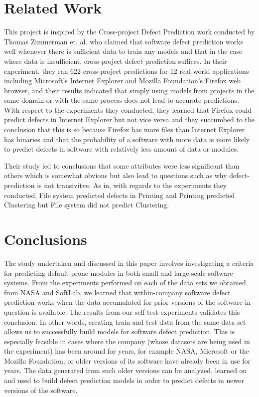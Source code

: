 \documentclass{sig-alternate}
\begin{document}
\section{Related Work}
This project is inspired by the Cross-project Defect Prediction work conducted by Thomas Zimmerman et. al. who claimed that software defect prediction works well whenever there is sufficient data to train any models and that in the case where data is insufficient, cross-project defect prediction suffices\cite{zimmerman09}. In their experiment, they ran 622 cross-project predictions for 12 real-world applications including Microsoft's Internet Explorer and Mozilla Foundation's Firefox web browser, and their results indicated that simply using models from projects in the same domain or with the same process does not lead to accurate predictions. With respect to the experiments they conducted, they learned that Firefox could predict defects in Internet Explorer but not vice versa and they succumbed to the conclusion that this is so because Firefox has more files than Internet Explorer has binaries and that the probability of a software with more data is more likely to predict defects in software with relatively less amount of data or modules. 

Their study led to conclusions that some attributes were less significant than others which is somewhat obvious but also lead to questions such as why defect-prediction is not transivitve. As in, with regards to the experiments they conducted, File system predicted defects in Printing and Printing predicted Clustering but File system did not predict Clustering.


\section{Conclusions}
The study undertaken and discussed in this paper involves investigating a criteria for predicting default-prone modules in both small and large-scale software systems. From the experiments performed on each of the data sets we obtained from NASA and SoftLab, we learned that within-company software defect prediction works when the data accumulated for prior versions of the software in question is available. The results from our self-test experiments validates this conclusion. In other words, creating train and test data from the same data set allows us to successfully build models for software defect prediction. This is especially feasible in cases where the company (whose datasets are being used in the experiment) has been around for years, for example NASA, Microsoft or the Mozilla Foundation; or older versions of its software have already been in use for years. The data generated from such older versions can be analyzed, learned on and used to build defect prediction models in order to predict defects in newer versions of the software.
\end{document}
